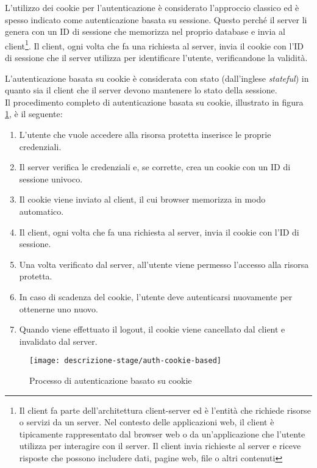 L'utilizzo dei cookie per l'autenticazione è considerato l'approccio classico ed è spesso indicato come autenticazione basata su sessione. 
Questo perché il server li genera con un ID di sessione che memorizza nel proprio database e invia al client\footnote{Il client fa parte dell'architettura client-server ed è l'entità che richiede risorse o servizi da un server. Nel contesto delle applicazioni web, il client è tipicamente rappresentato dal browser web o da un'applicazione che l'utente utilizza per interagire con il server. Il client invia richieste al server e riceve risposte che possono includere dati, pagine web, file o altri contenuti}.
Il client, ogni volta che fa una richiesta al server, invia il cookie con l'ID di sessione che il server utilizza per identificare l'utente, verificandone la validità.

L'autenticazione basata su cookie è considerata con stato (dall'inglese \emph{stateful}) in quanto sia il client che il server devono mantenere lo stato della sessione. \\

\noindent Il procedimento completo di autenticazione basata su cookie, illustrato in figura \ref{fig:auth-cookie-based}, è il seguente:
\begin{enumerate}
	\item L'utente che vuole accedere alla risorsa protetta inserisce le proprie credenziali.
	\item Il server verifica le credenziali e, se corrette, crea un cookie con un ID di sessione univoco.
	\item Il cookie viene inviato al client, il cui browser memorizza in modo automatico.
	\item Il client, ogni volta che fa una richiesta al server, invia il cookie con l'ID di sessione.
	\item Una volta verificato dal server, all'utente viene permesso l'accesso alla risorsa protetta.
	\item In caso di scadenza del cookie, l'utente deve autenticarsi nuovamente per ottenerne uno nuovo.
	\item Quando viene effettuato il logout, il cookie viene cancellato dal client e invalidato dal server.
\end{enumerate}

\begin{figure}[!ht] 
    \centering 
    \texttt{[image: descrizione-stage/auth-cookie-based]} 
    \caption{Processo di autenticazione basato su cookie}
	\label{fig:auth-cookie-based}
\end{figure}

